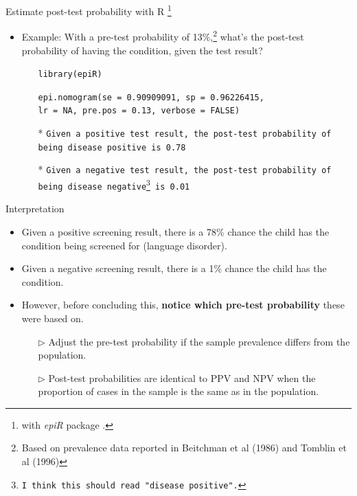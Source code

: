 \documentclass{beamer}
\begin{document}
% 
\begin{frame}{Estimate post-test probability with R \footnote{\tiny{with \emph{epiR} package \citep{RCoreTeam2019, Stevenson2017}.}}}
	\begin{itemize}
	\item Example: With a pre-test probability of 13\%,\footnote{\tiny{Based on prevalence data reported in Beitchman et al (1986) and Tomblin et al (1996)}} what's the post-test probability of having the condition, given the test result? \\
		\begin{itemize}
		\item[] \texttt{library(epiR)}
		\item[] \texttt{epi.nomogram(se = 0.90909091, sp = 0.96226415, \\ lr = NA, pre.pos = \alert{0.13}, verbose = FALSE)}
		\item[]
		\item[*] \texttt{Given a positive test result, the post-test probability of being disease positive is \alert{0.78}}
		\item[*] \texttt{Given a negative test result, the post-test probability of being disease negative\footnote{\tiny{I think this should read "disease positive".}} is \alert{0.01}}
		\end{itemize}
	\end{itemize}
\end{frame}

% 
\begin{frame}{Interpretation}
	\begin{itemize}
	\item Given a \alert{positive} screening result, there is a \alert{78\%} chance the child has the condition being screened for (language disorder).
	\item Given a \alert{negative} screening result, there is a \alert{1\%} chance the child has the condition.
	\item However, before concluding this, \textbf{notice which pre-test probability} these were based on.
		\begin{itemize}
		\item[$\rhd$] Adjust the pre-test probability if the sample prevalence differs from the population.
		\item[$\rhd$] Post-test probabilities are identical to PPV and NPV when the proportion of cases in the sample is the same as in the population.
		\end{itemize}
	\end{itemize}
\end{frame}
\end{document}
